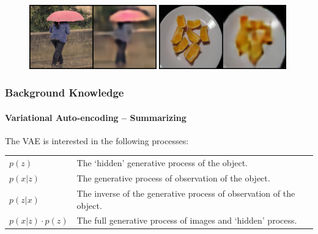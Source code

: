 \documentclass[t,aspectratio=169]{beamer}
\begin{document}
\begin{frame}
  \begin{figure}
    \centering
    \includegraphics[width=0.49\textwidth]{figures/beta-vae/samples/Imagenet-b0.01/20.png}
    \includegraphics[width=0.49\textwidth]{figures/beta-vae/samples/Imagenet-b0.01/21.png}
  \end{figure}
\end{frame}

\begin{frame}[fragile]
  
  \frametitle{Background Knowledge}
  \framesubtitle{Variational Auto-encoding -- Summarizing}
  
  The VAE is interested in the following processes:
  \begin{tabular}{ll}
    $p(z)$              & The `hidden' generative process of the object.                      \\
    $p(x | z)$          & The generative process of observation of the object.                \\
    $p(z | x)$          & The inverse of the generative process of observation of the object. \\
    $p(x|z) \cdot p(z)$ & The full generative process of images and `hidden' process.
  \end{tabular}
  
  
\end{frame}
\end{document}
